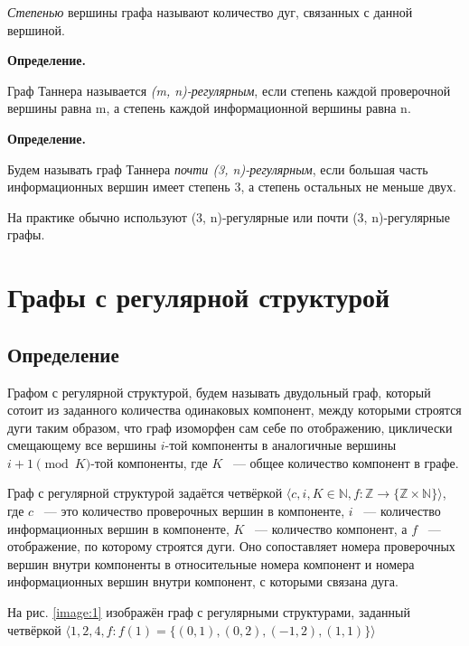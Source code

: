 \documentclass[14pt]{mmcs-article}
\begin{document}
\textsl{Степенью} вершины графа называют количество дуг, связанных с данной вершиной.

\textbf{Определение.}

Граф Таннера называется \textsl{(m, n)-регулярным}, если степень каждой проверочной вершины равна m, а степень каждой информационной вершины равна n.

\textbf{Определение.}

Будем называть граф Таннера \textsl{почти (3, n)-регулярным}, если большая часть информационных вершин имеет степень 3, а степень остальных не меньше двух.

На практике обычно используют (3, n)-регулярные или почти (3, n)-регулярные графы.

\newpage

\section{Графы с регулярной структурой}

\subsection{Определение}

Графом с регулярной структурой, будем называть двудольный граф, который сотоит из заданного количества одинаковых компонент, между которыми строятся дуги таким образом, что граф изоморфен сам себе по отображению, циклически смещающему все вершины $i$-той компоненты в аналогичные вершины $i + 1 \pmod K$-той компоненты, где $K$ ~--- общее количество компонент в графе.

Граф с регулярной структурой задаётся четвёркой $\langle c, i, K \in \mathbb{N}, f: \mathbb{Z} \rightarrow \{ \mathbb{Z} \times \mathbb{N} \} \rangle$, где $c$ ~--- это количество проверочных вершин в компоненте, $i$ ~--- количество информационных вершин в компоненте, $K$ ~--- количество компонент, а $f$ ~--- отображение, по которому строятся дуги. Оно сопоставляет номера проверочных вершин внутри компоненты в относительные номера компонент и номера информационных вершин внутри компонент, с которыми связана дуга.

На рис. \ref{image:1} изображён граф с регулярными структурами, заданный четвёркой $\langle 1, 2, 4, f: f(1) = \{ (0, 1), (0, 2), (-1, 2), (1, 1) \} \rangle$
\end{document}
